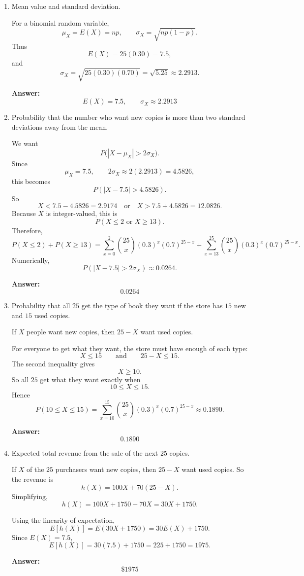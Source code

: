 \documentclass[11pt]{article}
\begin{document}
\begin{enumerate}
    \item[(a)] Mean value and standard deviation.

    For a binomial random variable,
    \[
    \mu_X=E(X)=np,\qquad \sigma_X=\sqrt{np(1-p)}.
    \]
    Thus
    \[
    E(X)=25(0.30)=7.5,
    \]
    and
    \[
    \sigma_X=\sqrt{25(0.30)(0.70)}=\sqrt{5.25}\approx 2.2913.
    \]

    \textbf{Answer:}
    \[
    \boxed{E(X)=7.5,\qquad \sigma_X\approx 2.2913}
    \]

    \item[(b)] Probability that the number who want new copies is more than two standard deviations away from the mean.

    We want
    \[
    P\bigl(|X-\mu_X|>2\sigma_X\bigr).
    \]
    Since
    \[
    \mu_X=7.5,\qquad 2\sigma_X\approx 2(2.2913)=4.5826,
    \]
    this becomes
    \[
    P(|X-7.5|>4.5826).
    \]
    So
    \[
    X<7.5-4.5826=2.9174
    \quad \text{or} \quad
    X>7.5+4.5826=12.0826.
    \]
    Because \(X\) is integer-valued, this is
    \[
    P(X\le 2 \text{ or } X\ge 13).
    \]
    Therefore,
    \[
    P(X\le 2)+P(X\ge 13)
    =\sum_{x=0}^{2}\binom{25}{x}(0.3)^x(0.7)^{25-x}
    +\sum_{x=13}^{25}\binom{25}{x}(0.3)^x(0.7)^{25-x}.
    \]
    Numerically,
    \[
    P(|X-7.5|>2\sigma_X)\approx 0.0264.
    \]

    \textbf{Answer:}
    \[
    \boxed{0.0264}
    \]

    \item[(c)] Probability that all \(25\) get the type of book they want if the store has \(15\) new and \(15\) used copies.

    If \(X\) people want new copies, then \(25-X\) want used copies.

    For everyone to get what they want, the store must have enough of each type:
    \[
    X\le 15
    \qquad \text{and} \qquad
    25-X\le 15.
    \]
    The second inequality gives
    \[
    X\ge 10.
    \]
    So all \(25\) get what they want exactly when
    \[
    10\le X\le 15.
    \]
    Hence
    \[
    P(10\le X\le 15)
    =\sum_{x=10}^{15}\binom{25}{x}(0.3)^x(0.7)^{25-x}
    \approx 0.1890.
    \]

    \textbf{Answer:}
    \[
    \boxed{0.1890}
    \]

    \item[(d)] Expected total revenue from the sale of the next \(25\) copies.

    If \(X\) of the \(25\) purchasers want new copies, then \(25-X\) want used copies. So the revenue is
    \[
    h(X)=100X+70(25-X).
    \]
    Simplifying,
    \[
    h(X)=100X+1750-70X=30X+1750.
    \]

    Using the linearity of expectation,
    \[
    E[h(X)]=E(30X+1750)=30E(X)+1750.
    \]
    Since \(E(X)=7.5\),
    \[
    E[h(X)]=30(7.5)+1750=225+1750=1975.
    \]

    \textbf{Answer:}
    \[
    \boxed{\$1975}
    \]
\end{enumerate}
\end{document}
